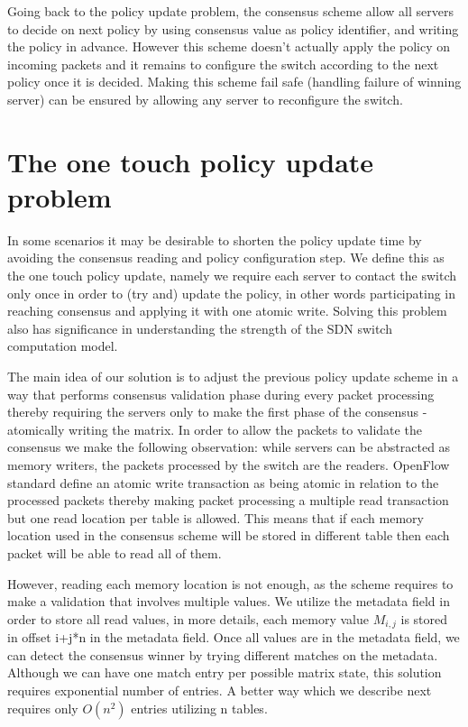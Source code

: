 \documentclass[conference]{sigcomm-alternate}
\begin{document}
Going back to the policy update problem, the consensus scheme allow all servers to decide on next policy by using consensus value as policy identifier, and writing the policy in advance. However this scheme doesn't actually apply the policy on incoming packets and it remains to configure the switch according to the next policy once it is decided. Making this scheme fail safe (handling failure of winning server) can be ensured by allowing any server to reconfigure the switch.

\section{The one touch policy update problem}\label{sec:todo}


In some scenarios it may be desirable to shorten the policy update time by avoiding the consensus reading and policy configuration step. We define this as the one touch policy update, namely we require each server to contact the switch only once in order to (try and) update the policy, in other words participating in reaching consensus and applying it with one atomic write. Solving this problem also has significance in understanding the strength of the SDN switch computation model.

The main idea of our solution is to adjust the previous policy update scheme in a way that performs consensus validation phase during every packet processing thereby requiring the servers only to make the first phase of the consensus - atomically writing the matrix.
In order to allow the packets to validate the consensus we make the following observation: while servers can be abstracted as memory writers, the packets processed by the switch are the readers. OpenFlow standard define an atomic write transaction as being atomic in relation to the processed packets thereby making packet processing a multiple read transaction but one read location per table is allowed. This means that if each memory location used in the consensus scheme will be stored in different table then each packet will be able to read all of them.

However, reading each memory location is not enough, as the scheme requires to make a validation that involves multiple values. We utilize the metadata field in order to store all read values, in more details, each memory value $M_{i,j}$ is stored in offset i+j*n in the metadata field. Once all values are in the metadata field, we can detect the consensus winner by trying different matches on the metadata. Although we can have one match entry per possible matrix state, this solution requires exponential number of entries. A better way which we describe next requires only $O(n^2)$ entries utilizing n tables.
\end{document}
